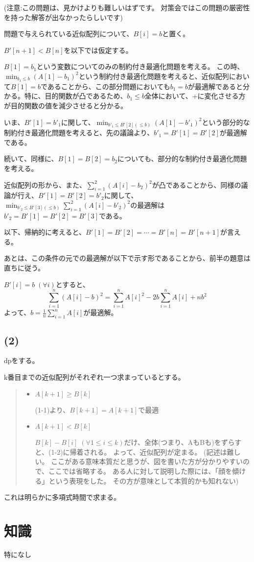 \documentclass[a4paper, 10pt, dvipdfmx]{jlreq}
\begin{document}
(注意:この問題は、見かけよりも難しいはずです。
対策会ではこの問題の厳密性を持った解答が出なかったらしいです)

問題で与えられている近似配列について、$B[i]=b$と置く。

$B'[n+1]<B[n]$を以下では仮定する。

$B[1]=b_1$という変数についてのみの制約付き最適化問題を考える。
この時、$\min_{b_1\leq b}(A[1]-b_1)^2$という制約付き最適化問題を考えると、近似配列において$B[1]=b$であることから、この部分問題においても$b_1=b$が最適解であると分かる。特に、目的関数が凸であるため、$b_1 \leq b$全体において、+に変化させる方が目的関数の値を減少させると分かる。

いま、$B'[1]=b'_1$に関して、$\min_{b'_1 \leq B'[2] (\leq b)}(A[1]-b'_1)^2$という部分的な制約付き最適化問題を考えると、先の議論より、$b'_1=B'[1]=B'[2]$が最適解である。

続いて、同様に、$B[1]=B[2]=b_2$についても、部分的な制約付き最適化問題を考える。

近似配列の形から、また、$\sum_{i=1}^{2}(A[i]-b_2)^2$が凸であることから、同様の議論が行え、$B'[1]=B'[2]=b'_2$に関して、$\min_{b'_2\leq B'[3](\leq b)}\sum_{i=1}^{2}(A[i]-b'_2)^2$の最適解は$b'_2=B'[1]=B'[2]=B'[3]$である。

以下、帰納的に考えると、$B'[1]=B'[2]=\cdots=B'[n]=B'[n+1]$が言える。

あとは、この条件の元での最適解が以下で示す形であることから、前半の題意は直ちに従う。

$B'[i]=b \; (\forall i)$とすると、
\begin{equation*}
  \sum_{i=1}^{n}{(A[i]-b)^2} = \sum_{i=1}^{n}{A[i]^2} -2b \sum_{i=1}^{n}{A[i]} + nb^2
\end{equation*}
よって、$b=\frac{1}{n}\sum_{i=1}^{n}{A[i]}$が最適解。

\subsection*{(2)}

dpをする。

k番目までの近似配列がそれぞれ一つ求まっているとする。

\begin{quote}
  \begin{itemize}
    \item  $A[k+1] \geq B[k]$

          (1-1)より、$B[k+1]=A[k+1]$で最適

    \item  $A[k+1] < B[k]$

          $B[k]-B[i] \; (\forall 1 \leq i \leq k)$だけ、全体(つまり、AもBも)をずらすと、(1-2)に帰着される。
          よって、近似配列が定まる。
          (記述は難しい。
          ここがある意味本質だと思うが、図を書いた方が分かりやすいので、ここでは省略する。
          ある人に対して説明した際には、「顔を傾ける」という表現をした。
          その方が意味として本質的かも知れない)
  \end{itemize}
\end{quote}

これは明らかに多項式時間で求まる。

\section{知識}

特になし
\end{document}
